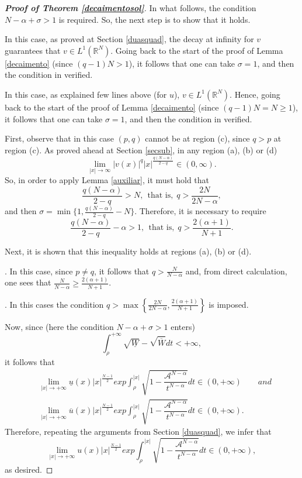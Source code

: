 \documentclass[12pt,a4paper]{article}
\numberwithin{equation}{section}
\begin{document}
\begin{proof}[\textbf{Proof of Theorem \ref{decaimentosol}}]
    
In what follows, the condition $N-\alpha + \sigma >1$ is required. So, the next step is to show that it holds.

\medbreak
{} In this case, as proved at Section \ref{duasquad}, the decay at infinity for $v$ guarantees that $v\in L^1(\mathbb{R}^N)$. Going back to the start of the proof of Lemma \ref{decaimento} (since $(q-1)N >1$), it follows that one can take $\sigma=1$, and then the condition in verified.

\medbreak 
{} In this case, as explained few lines above (for $u$), $v\in L^1(\mathbb{R}^N)$. Hence, going back to the start of the proof of Lemma \ref{decaimento} (since $(q-1)N= N \geq 1$), it follows that one can take $\sigma=1$, and then the condition in verified.

\medbreak 
{} First, observe that in this case $(p,q)$ cannot be at region (c), since $q>p$ at region (c). As proved ahead at Section \ref{secsub}, in any region (a), (b) or (d)
\[
\lim \limits_{|x| \to \infty} |v(x)|^q |x|^{\frac{q(N-\alpha)}{2-q}} \in (0, \infty).
\]
So, in order to apply Lemma \ref{auxiliar}, it must hold that
\[
\dfrac{q(N-\alpha)}{2-q} > N, \ \ \text{that is,} \ \ q> \dfrac{2N}{2N-\alpha},
\]
and then $\sigma = \min\{ 1, \frac{q(N-\alpha)}{2-q} - N\}$. Therefore, it is necessary to require
\[
\dfrac{q(N-\alpha)}{2-q} - \alpha > 1,  \ \ \text{that is,} \ \ q >\dfrac{2(\alpha +1)}{N + 1}.
\]

Next, it is shown that this inequality holds at regions (a), (b) or (d).

. In this case, since $p \neq q$, it follows that $q> \frac{N}{N-\alpha}$ and, from direct calculation, one sees that $\frac{N}{N-\alpha} \geq \frac{2(\alpha +1)}{N + 1}$.

.
In this cases  the condition $q> \max\left\{ \frac{2N}{2N-\alpha}, \frac{2(\alpha +1)}{N + 1} \right\}$ is imposed.




\medbreak    

    Now, since (here the condition $N-\alpha + \sigma >1$ enters)
    $$
    \int_{\rho}^{+\infty} \sqrt{\underline{W}} - \sqrt{\overline{W}} dt < +\infty, 
    $$
it follows that
   \begin{align*}
    &\lim\limits_{|x|\rightarrow +\infty}\underline{u}(x)|x|^{\frac{N-1}{2}}exp\int_{\rho}^{|x|}\sqrt{1-\dfrac{\mathcal{A}^{N-\alpha}}{t^{N-\alpha}}} dt \in (0, +\infty) \qquad{and} \\
    &\lim\limits_{|x|\rightarrow +\infty}\overline{u}(x)|x|^{\frac{N-1}{2}}exp\int_{\rho}^{|x|}\sqrt{1-\dfrac{\mathcal{A}^{N-\alpha}}{t^{N-\alpha}}} dt \in (0, +\infty).
   \end{align*}
    Therefore, repeating the arguments from Section \ref{duasquad}, we infer that
    $$
     \lim\limits_{|x|\rightarrow +\infty}u(x)|x|^{\frac{N-1}{2}}exp\int_{\rho}^{|x|}\sqrt{1-\dfrac{\mathcal{A}^{N-\alpha}}{t^{N-\alpha}}} dt \in (0, +\infty),  
    $$
    as desired.
\end{proof}
\end{document}
